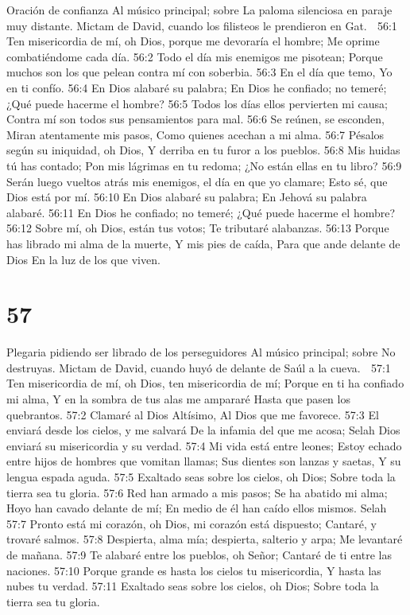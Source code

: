 Oración de confianza 
Al músico principal; sobre La paloma silenciosa en paraje muy distante. Mictam de David, cuando los filisteos le prendieron en Gat.   

56:1 Ten misericordia de mí, oh Dios, porque me devoraría el hombre; 
Me oprime combatiéndome cada día. 
56:2 Todo el día mis enemigos me pisotean; 
Porque muchos son los que pelean contra mí con soberbia. 
56:3 En el día que temo, 
Yo en ti confío. 
56:4 En Dios alabaré su palabra; 
En Dios he confiado; no temeré; 
¿Qué puede hacerme el hombre? 
56:5 Todos los días ellos pervierten mi causa; 
Contra mí son todos sus pensamientos para mal. 
56:6 Se reúnen, se esconden, 
Miran atentamente mis pasos, 
Como quienes acechan a mi alma. 
56:7 Pésalos según su iniquidad, oh Dios, 
Y derriba en tu furor a los pueblos. 
56:8 Mis huidas tú has contado; 
Pon mis lágrimas en tu redoma; 
¿No están ellas en tu libro? 
56:9 Serán luego vueltos atrás mis enemigos, el día en que yo clamare; 
Esto sé, que Dios está por mí. 
56:10 En Dios alabaré su palabra; 
En Jehová su palabra alabaré. 
56:11 En Dios he confiado; no temeré; 
¿Qué puede hacerme el hombre? 
56:12 Sobre mí, oh Dios, están tus votos; 
Te tributaré alabanzas. 
56:13 Porque has librado mi alma de la muerte, 
Y mis pies de caída, 
Para que ande delante de Dios 
En la luz de los que viven. 

\chapter{57}

Plegaria pidiendo ser librado de los perseguidores 
Al músico principal; sobre No destruyas. Mictam de David, cuando huyó de delante de Saúl a la cueva. 

57:1 Ten misericordia de mí, oh Dios, ten misericordia de mí; 
Porque en ti ha confiado mi alma, 
Y en la sombra de tus alas me ampararé 
Hasta que pasen los quebrantos. 
57:2 Clamaré al Dios Altísimo, 
Al Dios que me favorece. 
57:3 El enviará desde los cielos, y me salvará 
De la infamia del que me acosa; Selah 
Dios enviará su misericordia y su verdad. 
57:4 Mi vida está entre leones; 
Estoy echado entre hijos de hombres que vomitan llamas; 
Sus dientes son lanzas y saetas, 
Y su lengua espada aguda. 
57:5 Exaltado seas sobre los cielos, oh Dios; 
Sobre toda la tierra sea tu gloria. 
57:6 Red han armado a mis pasos; 
Se ha abatido mi alma; 
Hoyo han cavado delante de mí; 
En medio de él han caído ellos mismos. Selah 
57:7 Pronto está mi corazón, oh Dios, mi corazón está dispuesto; 
Cantaré, y trovaré salmos. 
57:8 Despierta, alma mía; despierta, salterio y arpa; 
Me levantaré de mañana. 
57:9 Te alabaré entre los pueblos, oh Señor; 
Cantaré de ti entre las naciones. 
57:10 Porque grande es hasta los cielos tu misericordia, 
Y hasta las nubes tu verdad. 
57:11 Exaltado seas sobre los cielos, oh Dios; 
Sobre toda la tierra sea tu gloria. 

